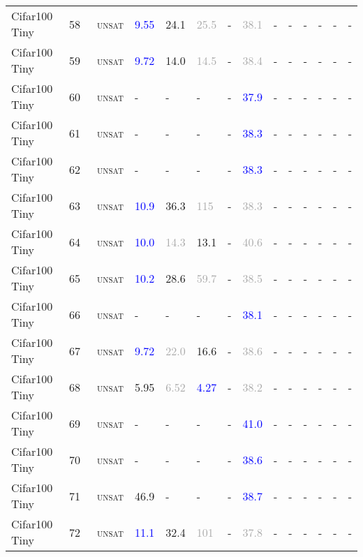 \begin{center}
{\begin{longtable}{@{}llllllllllllll@{}}
Cifar100 Tiny & 58 & ~\textsc{unsat} & \textcolor{blue}{9.55} & \textcolor{second}{24.1} & \textcolor{darkgray}{25.5} & - & \textcolor{darkgray}{38.1} & - & - & - & - & - & - \\
Cifar100 Tiny & 59 & ~\textsc{unsat} & \textcolor{blue}{9.72} & \textcolor{second}{14.0} & \textcolor{darkgray}{14.5} & - & \textcolor{darkgray}{38.4} & - & - & - & - & - & - \\
Cifar100 Tiny & 60 & ~\textsc{unsat} & - & - & - & - & \textcolor{blue}{37.9} & - & - & - & - & - & - \\
Cifar100 Tiny & 61 & ~\textsc{unsat} & - & - & - & - & \textcolor{blue}{38.3} & - & - & - & - & - & - \\
Cifar100 Tiny & 62 & ~\textsc{unsat} & - & - & - & - & \textcolor{blue}{38.3} & - & - & - & - & - & - \\
Cifar100 Tiny & 63 & ~\textsc{unsat} & \textcolor{blue}{10.9} & \textcolor{second}{36.3} & \textcolor{darkgray}{115} & - & \textcolor{darkgray}{38.3} & - & - & - & - & - & - \\
Cifar100 Tiny & 64 & ~\textsc{unsat} & \textcolor{blue}{10.0} & \textcolor{darkgray}{14.3} & \textcolor{second}{13.1} & - & \textcolor{darkgray}{40.6} & - & - & - & - & - & - \\
Cifar100 Tiny & 65 & ~\textsc{unsat} & \textcolor{blue}{10.2} & \textcolor{second}{28.6} & \textcolor{darkgray}{59.7} & - & \textcolor{darkgray}{38.5} & - & - & - & - & - & - \\
Cifar100 Tiny & 66 & ~\textsc{unsat} & - & - & - & - & \textcolor{blue}{38.1} & - & - & - & - & - & - \\
Cifar100 Tiny & 67 & ~\textsc{unsat} & \textcolor{blue}{9.72} & \textcolor{darkgray}{22.0} & \textcolor{second}{16.6} & - & \textcolor{darkgray}{38.6} & - & - & - & - & - & - \\
Cifar100 Tiny & 68 & ~\textsc{unsat} & \textcolor{second}{5.95} & \textcolor{darkgray}{6.52} & \textcolor{blue}{4.27} & - & \textcolor{darkgray}{38.2} & - & - & - & - & - & - \\
Cifar100 Tiny & 69 & ~\textsc{unsat} & - & - & - & - & \textcolor{blue}{41.0} & - & - & - & - & - & - \\
Cifar100 Tiny & 70 & ~\textsc{unsat} & - & - & - & - & \textcolor{blue}{38.6} & - & - & - & - & - & - \\
Cifar100 Tiny & 71 & ~\textsc{unsat} & \textcolor{second}{46.9} & - & - & - & \textcolor{blue}{38.7} & - & - & - & - & - & - \\
Cifar100 Tiny & 72 & ~\textsc{unsat} & \textcolor{blue}{11.1} & \textcolor{second}{32.4} & \textcolor{darkgray}{101} & - & \textcolor{darkgray}{37.8} & - & - & - & - & - & - \\

\end{longtable}}
\end{center}
